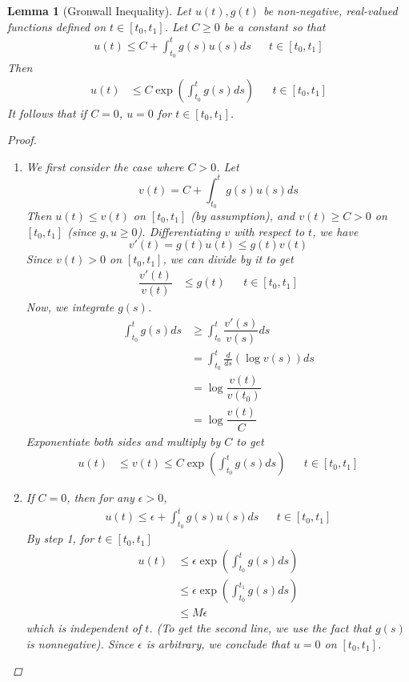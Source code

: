 \documentclass[12pt]{amsart}         %
\newtheorem{lemma}{Lemma}[section]
\theoremstyle{remark}
\begin{document}
\begin{lemma}[Gronwall Inequality]
Let $u(t), g(t)$ be non-negative, real-valued functions defined on $t \in [t_0, t_1]$. Let $C \geq 0$ be a constant so that
\begin{align*}
u(t) \leq C + \int_{t_0}^t g(s) u(s) ds && t \in [t_0, t_1]
\end{align*}
Then
\begin{align*}
u(t) &\leq C \exp \left( \int_{t_0}^t g(s) ds \right) && t \in [t_0, t_1]
\end{align*}
It follows that if $C = 0$, $u = 0$ for $t \in [t_0, t_1]$.
\begin{proof}
\begin{enumerate}
\item We first consider the case where $C > 0$. Let
\[
v(t) = C + \int_{t_0}^t g(s) u(s) ds
\]
Then $u(t) \leq v(t)$ on $[t_0, t_1]$ (by assumption), and $v(t) \geq C > 0$ on $[t_0, t_1]$ (since $g, u \geq 0$). Differentiating $v$ with respect to $t$, we have
\[
v'(t) = g(t) u(t) \leq g(t)v(t)
\] 
Since $v(t) > 0$ on $[t_0, t_1]$, we can divide by it to get
\begin{align*}
\dfrac{v'(t)}{v(t)} &\leq g(t) && t \in [t_0, t_1]
\end{align*}
Now, we integrate $g(s)$.
\begin{align*}
\int_{t_0}^t g(s) ds &\geq \int_{t_0}^t \dfrac{v'(s)}{v(s)} ds \\
&= \int_{t_0}^t \frac{d}{ds}\left( \log {v(s)} \right) ds \\
&= \log\dfrac{v(t)}{v(t_0)}\\
&= \log\dfrac{v(t)}{C}
\end{align*}
Exponentiate both sides and multiply by $C$ to get
\begin{align*}
u(t) &\leq v(t) \leq C \exp \left( \int_{t_0}^t g(s) ds \right) && t \in [t_0, t_1]
\end{align*}
\item If $C = 0$, then for any $\epsilon > 0$,
\begin{align*}
u(t) \leq \epsilon + \int_{t_0}^t g(s) u(s) ds && t \in [t_0, t_1]
\end{align*}
By step 1, for $t \in [t_0, t_1]$ 
\begin{align*}
u(t) &\leq \epsilon \exp \left( \int_{t_0}^t g(s) ds \right) \\&\leq \epsilon \exp \left( \int_{t_0}^{t_1} g(s) ds \right) \\
&\leq M \epsilon
\end{align*}
which is independent of $t$. (To get the second line, we use the fact that $g(s)$ is nonnegative). Since $\epsilon$ is arbitrary, we conclude that $u = 0$ on $[t_0, t_1]$.
\end{enumerate}
\end{proof}
\end{lemma}
\end{document}
